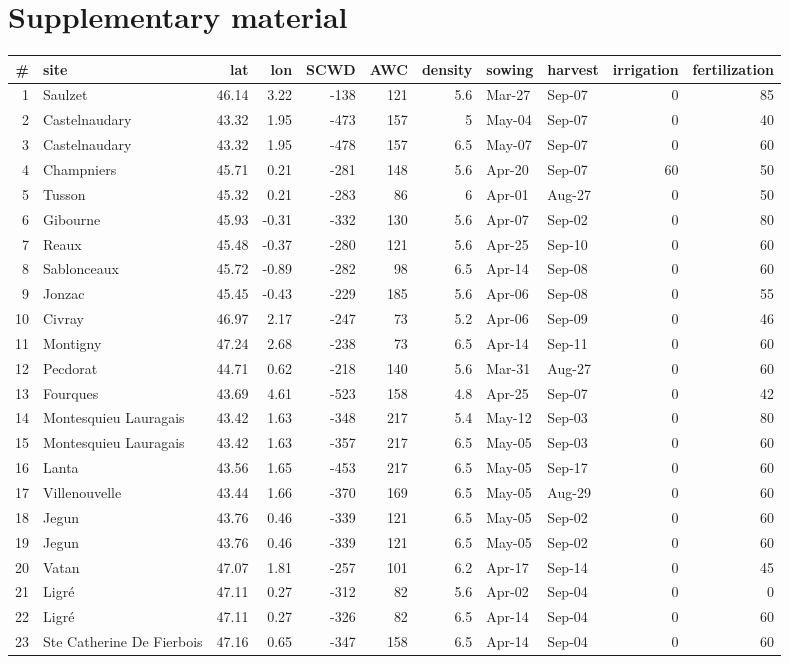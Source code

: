 \documentclass[a4paper]{article}
\begin{document}
\section{Supplementary material}\label{supplementary-material}

\footnotesize

\begin{longtable}[]{@{}rlrrrrrllrr@{}}
\toprule
\# & site & lat & lon & SCWD & AWC & density & sowing & harvest &
irrigation & fertilization\tabularnewline
\midrule
\endhead
1 & Saulzet & 46.14 & 3.22 & -138 & 121 & 5.6 & Mar-27 & Sep-07 & 0 &
85\tabularnewline
2 & Castelnaudary & 43.32 & 1.95 & -473 & 157 & 5 & May-04 & Sep-07 & 0
& 40\tabularnewline
3 & Castelnaudary & 43.32 & 1.95 & -478 & 157 & 6.5 & May-07 & Sep-07 &
0 & 60\tabularnewline
4 & Champniers & 45.71 & 0.21 & -281 & 148 & 5.6 & Apr-20 & Sep-07 & 60
& 50\tabularnewline
5 & Tusson & 45.32 & 0.21 & -283 & 86 & 6 & Apr-01 & Aug-27 & 0 &
50\tabularnewline
6 & Gibourne & 45.93 & -0.31 & -332 & 130 & 5.6 & Apr-07 & Sep-02 & 0 &
80\tabularnewline
7 & Reaux & 45.48 & -0.37 & -280 & 121 & 5.6 & Apr-25 & Sep-10 & 0 &
60\tabularnewline
8 & Sablonceaux & 45.72 & -0.89 & -282 & 98 & 6.5 & Apr-14 & Sep-08 & 0
& 60\tabularnewline
9 & Jonzac & 45.45 & -0.43 & -229 & 185 & 5.6 & Apr-06 & Sep-08 & 0 &
55\tabularnewline
10 & Civray & 46.97 & 2.17 & -247 & 73 & 5.2 & Apr-06 & Sep-09 & 0 &
46\tabularnewline
11 & Montigny & 47.24 & 2.68 & -238 & 73 & 6.5 & Apr-14 & Sep-11 & 0 &
60\tabularnewline
12 & Pecdorat & 44.71 & 0.62 & -218 & 140 & 5.6 & Mar-31 & Aug-27 & 0 &
60\tabularnewline
13 & Fourques & 43.69 & 4.61 & -523 & 158 & 4.8 & Apr-25 & Sep-07 & 0 &
42\tabularnewline
14 & Montesquieu Lauragais & 43.42 & 1.63 & -348 & 217 & 5.4 & May-12 &
Sep-03 & 0 & 80\tabularnewline
15 & Montesquieu Lauragais & 43.42 & 1.63 & -357 & 217 & 6.5 & May-05 &
Sep-03 & 0 & 60\tabularnewline
16 & Lanta & 43.56 & 1.65 & -453 & 217 & 6.5 & May-05 & Sep-17 & 0 &
60\tabularnewline
17 & Villenouvelle & 43.44 & 1.66 & -370 & 169 & 6.5 & May-05 & Aug-29 &
0 & 60\tabularnewline
18 & Jegun & 43.76 & 0.46 & -339 & 121 & 6.5 & May-05 & Sep-02 & 0 &
60\tabularnewline
19 & Jegun & 43.76 & 0.46 & -339 & 121 & 6.5 & May-05 & Sep-02 & 0 &
60\tabularnewline
20 & Vatan & 47.07 & 1.81 & -257 & 101 & 6.2 & Apr-17 & Sep-14 & 0 &
45\tabularnewline
21 & Ligré & 47.11 & 0.27 & -312 & 82 & 5.6 & Apr-02 & Sep-04 & 0 &
0\tabularnewline
22 & Ligré & 47.11 & 0.27 & -326 & 82 & 6.5 & Apr-14 & Sep-04 & 0 &
60\tabularnewline
23 & Ste Catherine De Fierbois & 47.16 & 0.65 & -347 & 158 & 6.5 &
Apr-14 & Sep-04 & 0 & 60\tabularnewline

\end{longtable}
\end{document}
